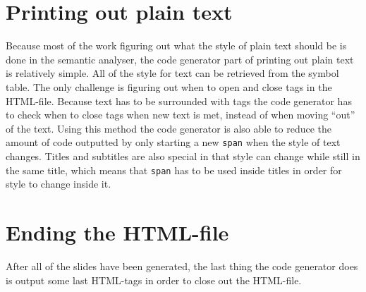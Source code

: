 \section{Printing out plain text}
Because most of the work figuring out what the style of plain text should be is done in the semantic analyser, the code generator part of printing out plain text is relatively simple. All of the style for text can be retrieved from the symbol table. The only challenge is figuring out when to open and close tags in the HTML-file. Because text has to be surrounded with tags the code generator has to check when to close tags when new text is met, instead of when moving ``out'' of the text. Using this method the code generator is also able to reduce the amount of code outputted by only starting a new \texttt{span} when the style of text changes. Titles and subtitles are also special in that style can change while still in the same title, which means that \texttt{span} has to be used inside titles in order for style to change inside it.

\section{Ending the HTML-file}
After all of the slides have been generated, the last thing the code generator does is output some last HTML-tags in order to close out the HTML-file.
